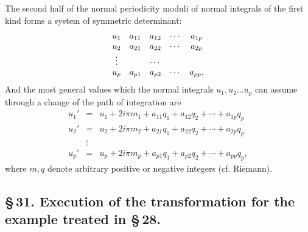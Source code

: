 \documentclass[10pt]{article}
\begin{document}
The second half of the normal periodicity moduli of normal integrals of the first kind forms a system of symmetric determinant:
\[
\begin{array}{c@{\quad}cccc}
u_1&a_{11}&a_{12}&\cdots&a_{1p}\\
u_2&a_{21}&a_{22}&\cdots&a_{2p}\\
\vdots&&\cdots&&\\
u_p&a_{p1}&a_{p2}&\cdots&a_{pp}.
\end{array}
\]
And the most general values which the normal integrals \(u_1,u_2\ldots u_p\) can assume through a change of the path of integration are
\[
\begin{array}{rcl}
u_1'&=&u_1+2i\pi m_1+a_{11}q_1+a_{12}q_2+\cdots+a_{1p}q_p\\
u_2'&=&u_2+2i\pi m_2+a_{21}q_1+a_{22}q_2+\cdots+a_{2p}q_p\\
&\vdots&\\
u_p'&=&u_p+2i\pi m_p+a_{p1}q_1+a_{p2}q_2+\cdots+a_{pp}q_p,
\end{array}
\]
where \(m,q\) denote arbitrary positive or negative integers (cf. Riemann).

\subsection*{\S\,31. Execution of the transformation for the example treated in \S\,28.}
\end{document}
